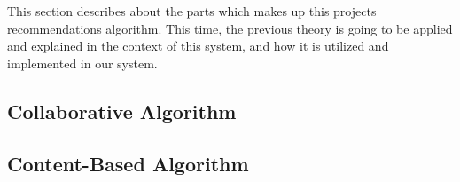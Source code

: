 This section describes about the parts which makes up this projects recommendations algorithm. This time, the previous theory is going to be applied and explained in the context of this system, and how it is utilized and implemented in our system.

\subsection{Collaborative Algorithm}
\label{CollaborativeAlg}

\subsection{Content-Based Algorithm}
\label{ContentBasedAlg}
